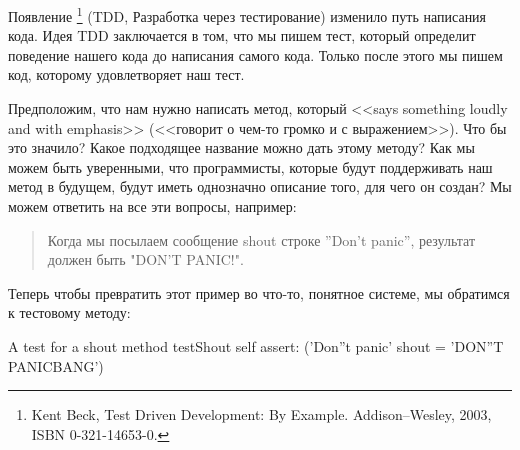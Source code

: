 \documentclass[a4paper,10pt,twoside]{book}
\begin{document}
Появление \footnote{Kent Beck, Test Driven
Development: By Example. Addison--Wesley, 2003, ISBN 0-321-14653-0.}
(TDD, Разработка через тестирование) изменило путь написания кода.
Идея TDD заключается в том, что мы пишем тест, который определит
поведение нашего кода  до написания самого кода. Только после этого
мы пишем код, которому удовлетворяет наш тест.


Предположим, что нам нужно написать метод, который
<<says something loudly and with emphasis>> (<<говорит о чем-то
громко и с выражением>>). Что бы это значило? Какое подходящее
название можно дать этому методу? Как мы можем быть уверенными,
что программисты, которые будут поддерживать наш метод в будущем,
будут иметь однозначно описание того, для чего он создан? Мы можем
ответить на все эти вопросы, например: 


\begin{quote}
Когда мы посылаем сообщение shout строке ''Don't panic'', результат
должен быть "DON'T PANIC!". 
\end{quote}


\noindent
Теперь чтобы превратить этот пример во что-то, понятное системе, мы обратимся к тестовому методу:
 
\begin{method}[testShout]{A test for a shout method}
testShout
	self assert: ('Don''t panic' shout = 'DON''T PANICBANG')
\end{method} %

\end{document}
